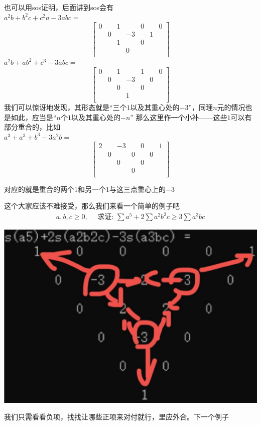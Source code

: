 \documentclass[UTF8]{ctexart}
\begin{document}
也可以用sos证明，后面讲到sos会有\label{1}\pageref{2}\\
$ a^{2}b+b^{2}c+c^{2}a-3abc= $
\renewcommand*{\arraystretch}{1.732}\[\left[\begin{matrix}
	0& & 1& &0& & 0\\
	& 0& & -3& &1 &\\
	& & 1& &0& & \\
	& & & 0& & &\\
\end{matrix}\right]\]
$ a^{2}b+ab^{2}+c^{3}-3abc= $
\renewcommand*{\arraystretch}{1.732}\[\left[\begin{matrix}
	0& & 1& &1& & 0\\
	& 0& & -3& &0 &\\
	& & 0& &0& & \\
	& & & 1& & &\\
\end{matrix}\right]\]
我们可以惊讶地发现，其形态就是“三个$ 1 $以及其重心处的$ -3 $”，同理$ n $元的情况也是如此，应当是“$ n $个$ 1 $以及其重心处的$ -n $”
那么这里作一个小补——这些$ 1 $可以有部分重合的，比如\\
$ a^{3}+a^{3}+b^{3}-3a^{2}b= $
\renewcommand*{\arraystretch}{1.732}\[\left[\begin{matrix}
	2& & -3& &0& & 1\\
	& 0& & 0& &0 &\\
	& & 0& &0& & \\
	& & & 0& & &\\
\end{matrix}\right]\]

对应的就是重合的两个$ 1 $和另一个$ 1 $与这三点重心上的$ -3 $

这个大家应该不难接受，那么我们来看一个简单的例子吧
$$
\begin{gathered}
	a, b, c \geq 0, \quad \text { 求证: } \sum a^{5}+2 \sum a^{2} b^{2} c \geq 3 \sum a^{3} b c
\end{gathered}
$$
\begin{center}
	\includegraphics[width=0.4\linewidth]{12}
\end{center}

我们只需看看负项，找找让哪些正项来对付就行，里应外合。下一个例子
\end{document}
